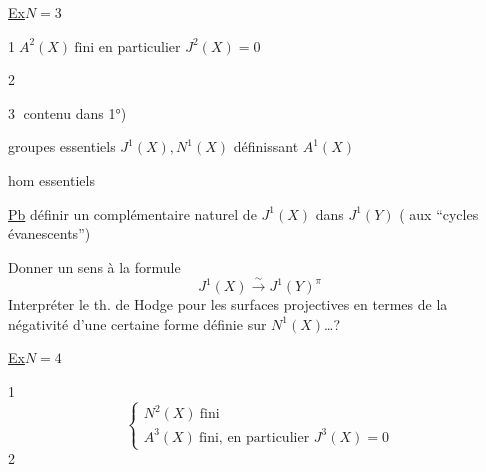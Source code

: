 \uline{Ex}\quad \(N=3\)

\textcircled{1}\quad \(\boxed{A^2(X)\ \text{fini}}\) en particulier \(J^2(X)=0\)

\textcircled{2}\quad
{}

\textcircled{3}\quad {} contenu dans 1°)

groupes essentiels \(J^1(X),N^1(X)\) définissant \(A^1(X)\)

hom essentiels

\uline{Pb} définir un complémentaire naturel de \(J^1(X)\) dans \(J^1(Y)\) ( aux ``cycles évanescents'')

Donner un sens à la formule
\[
J^1(X)\xrightarrow{\sim}J^1(Y)^\pi
\]
Interpréter le th. de  Hodge pour les surfaces projectives en termes de la négativité d'une certaine forme définie sur \(N^1(X)\)\ldots ?

\uline{Ex}\quad \(N=4\)

\textcircled{1}\quad
\[
\left\{\begin{array}{l}N^2(X)\ \text{fini}\\A^3(X)\ \text{fini, en particulier }J^3(X)=0\end{array}\right.
\]
\textcircled{2}\quad
{}
\textcircled{}
